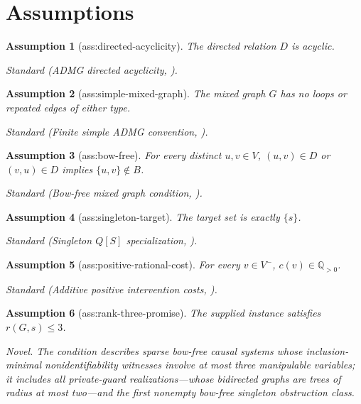 \documentclass{article}
\newtheorem{assumption}{Assumption}
\begin{document}
\section{Assumptions}

\begin{assumption}[ass:directed-acyclicity]\label{ass:directed-acyclicity}
The directed relation \(D\) is acyclic.
\par\smallskip\noindent\emph{Standard} (ADMG directed acyclicity, \cite{ShpitserPearl2006}).
\end{assumption}

\begin{assumption}[ass:simple-mixed-graph]\label{ass:simple-mixed-graph}
The mixed graph \(G\) has no loops or repeated edges of either type.
\par\smallskip\noindent\emph{Standard} (Finite simple ADMG convention, \cite{RichardsonSpirtes2002}).
\end{assumption}

\begin{assumption}[ass:bow-free]\label{ass:bow-free}
For every distinct \(u,v\in V\), \((u,v)\in D\) or \((v,u)\in D\) implies \(\{u,v\}\notin B\).
\par\smallskip\noindent\emph{Standard} (Bow-free mixed graph condition, \cite{RichardsonSpirtes2002}).
\end{assumption}

\begin{assumption}[ass:singleton-target]\label{ass:singleton-target}
The target set is exactly \(\{s\}\).
\par\smallskip\noindent\emph{Standard} (Singleton \(Q[S]\) specialization, \cite{AkbariEtesamiKiyavash2025}).
\end{assumption}

\begin{assumption}[ass:positive-rational-cost]\label{ass:positive-rational-cost}
For every \(v\in V^{-}\), \(c(v)\in\mathbb Q_{>0}\).
\par\smallskip\noindent\emph{Standard} (Additive positive intervention costs, \cite{AkbariEtesamiKiyavash2025}).
\end{assumption}

\begin{assumption}[ass:rank-three-promise]\label{ass:rank-three-promise}
The supplied instance satisfies \(r(G,s)\leq3\).
\par\smallskip\noindent\emph{Novel.} The condition describes sparse bow-free causal systems whose inclusion-minimal nonidentifiability witnesses involve at most three manipulable variables; it includes all private-guard realizations—whose bidirected graphs are trees of radius at most two—and the first nonempty bow-free singleton obstruction class.
\end{assumption}
\end{document}
